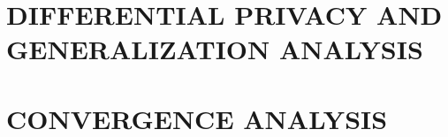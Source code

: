 %

\section{DIFFERENTIAL PRIVACY AND GENERALIZATION ANALYSIS} \label{sec: pri}


\section{CONVERGENCE ANALYSIS}



%

%